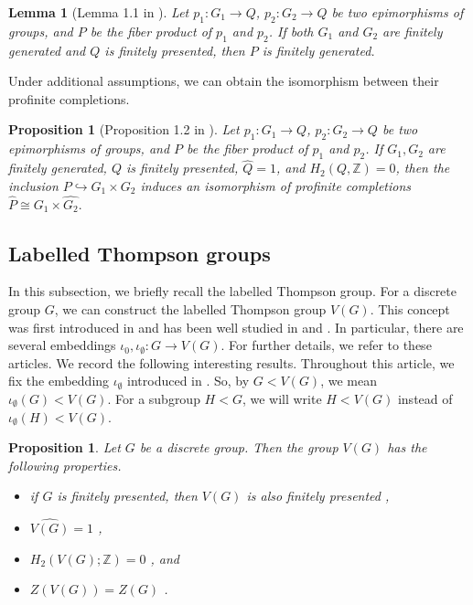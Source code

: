 \documentclass[11pt]{amsart}
\newtheorem{lem}[thm]{Lemma}
\newtheorem{prop}[thm]{Proposition}
\theoremstyle{definition}
\newcommand{\ZZ}{\mathbb{Z}}
\begin{document}
\begin{lem}[Lemma 1.1 in \cite{bridson2024profinite}] \label{lem:P-f.g.}
Let $p_1 : G_1 \to Q$, $p_2 : G_2 \to Q$ be two epimorphisms of groups, and $P$ be the fiber product of $p_1$ and $p_2$.
If both $G_1$ and $G_2$ are finitely generated and $Q$ is finitely presented, then $P$ is finitely generated.
\end{lem}

 Under additional assumptions, we can obtain the isomorphism between their profinite completions.

\begin{prop}[Proposition 1.2 in \cite{bridson2024profinite}] \label{Fiber_profinite_completion}
Let $p_1 : G_1 \to Q$, $p_2 : G_2 \to Q$ be two epimorphisms of groups, and $P$ be the fiber product of $p_1$ and $p_2$. 
If $G_1, G_2$ are finitely generated, $Q$ is finitely presented, $\widehat{Q}=1$, and $H_2(Q,\ZZ)=0$, then the inclusion $P \hookrightarrow G_1 \times G_2 $ induces an isomorphism of profinite completions $\widehat{P} \cong \widehat{G_1} \times \widehat{G_2}.$
\end{prop}

\subsection{Labelled Thompson groups}

In this subsection, we briefly recall the labelled Thompson group.
For a discrete group $G$, we can construct the labelled Thompson group $V(G)$.
This concept was first introduced in \cite{thompson1980embeddings} and has been well studied in \cite{wu2025embedding} and \cite{palmer2025embedding}.
In particular, there are several embeddings $\iota_0, \iota_{\emptyset}:G \to V(G)$.
For further details, we refer to these articles.
We record the following interesting results.
Throughout this article, we fix the embedding $\iota_{\emptyset}$ introduced in \cite{palmer2025embedding}.
So, by $G<V(G)$, we mean $\iota_\emptyset(G)<V(G)$.
For a subgroup $H<G$, we will write $H<V(G)$ instead of $\iota_\emptyset(H)<V(G)$.
 \begin{prop} \label{prop:G-V(G)}
 Let $G$ be a discrete group.
 Then the group $V(G)$ has the following properties.
 \begin{itemize}
    \item if $G$ is finitely presented, then $V(G)$ is also finitely presented \cite[Corollary 3.19]{wu2025embedding},
    \item $\widehat{V(G)}=1$ \cite[Corollary 2.3]{wu2025embedding},
    \item $H_2(V(G);\ZZ)=0$ \cite[Theorem 2.6]{palmer2025embedding}, and
    \item $Z(V(G))=Z(G)$ \cite[Proposition 2.8]{palmer2025embedding}.
 \end{itemize}
 \end{prop}
\end{document}
